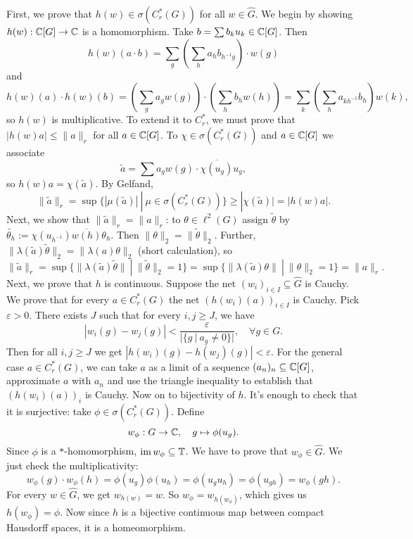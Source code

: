 \begin{myproof}
  First, we prove that $h(w) \in \sigma (C_r ^* (G))$ for all $w \in \widehat{G}$.
  We begin by showing $h(w): \mathbb {C} [G] \to \mathbb {C}$ is a homomorphism. Take $b = \sum b_k u_k \in \mathbb {C} [G]$.
  Then $$h(w) (a \cdot b) = \sum_g \left(\sum_h a_h b_{h^{-1} g}\right) \cdot w(g)$$
  and $$h(w) (a) \cdot h(w) (b) = \left(\sum_g a_g w(g)\right) \cdot \left(\sum_h b_h w(h)\right) = \sum_k \left(\sum_h a_{k h^{-1}} b_h\right) w(k),$$
  so $h(w)$ is multiplicative. To extend it to $C_r ^*$, we must prove that $| h(w) a| \leq \| a\|_r$ for all $a \in \mathbb {C} [G]$.
  To $\chi \in \sigma(C_r ^* (G))$ and $a \in \mathbb {C}[G]$ we associate 
  $$\widetilde{a} = \sum a_g w(g) \cdot \overline{\chi(u_g)} u_g,$$
  so $h(w) a = \chi(\widetilde{a})$. By Gelfand, 
  $$\| \widetilde{a} \|_r = \sup \{| \mu (\widetilde{a}) |\ |\ \mu \in \sigma (C_r ^* (G))\} \geq |\chi(\widetilde{a})| = |h(w) a|.$$
  Next, we show that $\| \widetilde{a} \|_r = \| a \|_r$: to $\theta \in \ell^2 (G)$ assign $\widetilde{\theta}$ by 
  $\widetilde{\theta_h} := \chi(u_{h^{-1}}) \overline{w(h)} \theta_h.$
  Then $\| \theta\|_2 = \| \widetilde{\theta} \|_2$. Further,
  $\| \lambda (\widetilde{a}) \widetilde{\theta} \|_2 = \| \lambda (a) \theta\|_2$ (short calculation), so 
  $$\| \widetilde{a} \|_r = \sup \{ \|\lambda(\widetilde{a}) \widetilde{\theta} \|\ |\ \| \widetilde{\theta} \|_2 = 1\} = \sup \{ \|\lambda(\widetilde{a}) {\theta} \|\ |\ \| {\theta} \|_2 = 1\} = \| a\|_r.$$
  Next, we prove that $h$ is continuous. Suppose the net $(w_i)_{i \in I} \subseteq \widehat{G}$ is Cauchy.
  We prove that for every $a \in C_r ^* (G)$ the net $(h(w_i) (a))_{i \in I}$ is Cauchy.
  Pick $\varepsilon > 0$. There exists $J$ such that for every $i, j \geq J$, we have 
  $$|w_i (g) - w_j (g)| < \frac{\varepsilon}{|\{g\ |\ a_g \neq 0\}|},\quad \forall g \in G.$$
  Then for all $i, j \geq J$ we get $|h(w_i) (g) - h(w_j) (g)| < \varepsilon$.
  For the general case $a \in C_r ^* (G)$, we can take $a$ as a limit of a sequence $(a_n)_n \subseteq \mathbb {C} [G]$,
  approximate $a$ with $a_n$ and use the triangle inequality to establish that $(h(w_i) (a))_i$ is Cauchy.
  Now on to bijectivity of $h$. It's enough to check that it is surjective: take $\phi \in \sigma(C_r ^* (G))$. Define 
  $$w_{\phi} : G \to \mathbb {C},\quad g \mapsto \phi(u_g).$$
  Since $\phi$ is a $*$-homomorphism, $\operatorname{im} w_{\phi} \subseteq \mathbb{T}$.
  We have to prove that $w_{\phi} \in \widehat{G}$. We just check the multiplicativity:
  $$w_{\phi} (g) \cdot w_{\phi} (h) = \phi(u_g) \phi(u_h) = \phi(u_g u_h) = \phi(u_{gh}) = w_{\phi} (gh).$$
  For every $w \in \widehat{G}$, we get $w_{h(w)} = w$. So $w_{\phi} = w_{h(w_\phi)}$,
  which gives us $h(w_{\phi}) = \phi$. Now since $h$ is a bijective continuous map between compact Hausdorff spaces, it is a homeomorphism.
\end{myproof}

